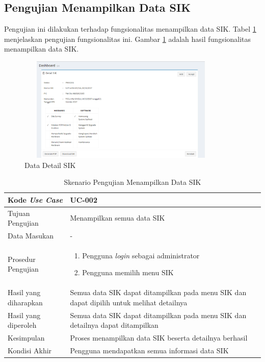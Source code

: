 \subsection{Pengujian Menampilkan Data SIK}
Pengujian ini dilakukan terhadap fungsionalitas menampilkan data SIK. Tabel \ref{tab:list_sik} menjelaskan pengujian fungsionalitas ini. Gambar \ref{figure:data_detail_sik} adalah hasil fungsionalitas menampilkan data SIK.
\begin{figure}[h!]
\centerline
{\includegraphics[width=10cm,height=5cm]{bab6/detailSIK.png}}
\caption{Data Detail SIK}
\label{figure:data_detail_sik}
\end{figure}

\begin{table}[h!]
	\centering
	\begin{tabular}{|p{4cm}|p{6cm}|}
	\hline
	Kode \textit{Use Case} & UC-002\\ \hline
	Tujuan Pengujian & Menampilkan semua data SIK\\ \hline
	Data Masukan & - \\ \hline
	Prosedur Pengujian & 
		\begin{enumerate}
		\item Pengguna \textit{login} sebagai administrator
		\item Pengguna memilih menu SIK
		\end{enumerate}\\ \hline
	Hasil yang diharapkan & Semua data SIK dapat ditampilkan pada menu SIK dan dapat dipilih untuk melihat detailnya \\ \hline
	Hasil yang diperoleh & Semua data SIK dapat ditampilkan pada menu SIK dan detailnya dapat ditampilkan\\ \hline
	Kesimpulan & Proses menampilkan data SIK beserta detailnya berhasil\\ \hline
	Kondisi Akhir & Pengguna mendapatkan semua informasi data SIK\\ \hline
	\end{tabular}\caption{Skenario Pengujian Menampilkan Data SIK}
	\label{tab:list_sik}
\end{table}

